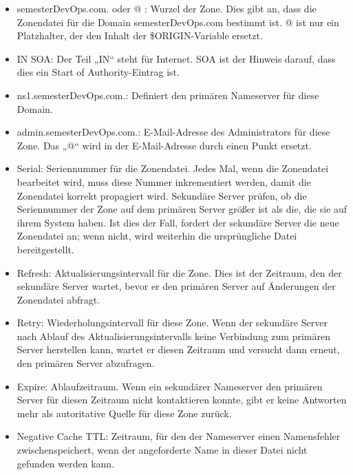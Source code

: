 \documentclass[a4paper,12pt]{article}
\begin{document}
\begin{itemize}
	\item semesterDevOps.com. oder @ : Wurzel der Zone. Dies gibt an, dass die Zonendatei für die Domain semesterDevOps.com bestimmt ist.
@ ist nur ein Platzhalter, der den Inhalt der \${}ORIGIN-Variable ersetzt.

\item IN SOA: Der Teil „IN“ steht für Internet. SOA ist der Hinweis darauf, dass dies ein Start of Authority-Eintrag ist.

\item ns1.semesterDevOps.com.: Definiert den primären Nameserver für diese Domain.

\item admin.semesterDevOps.com.: E-Mail-Adresse des Administrators für diese Zone. Das „@“ wird in der E-Mail-Adresse durch einen Punkt ersetzt.

\item Serial: Seriennummer für die Zonendatei. Jedes Mal, wenn die Zonendatei bearbeitet wird, muss diese Nummer inkrementiert werden, damit die Zonendatei korrekt propagiert wird.
Sekundäre Server prüfen, ob die Seriennummer der Zone auf dem primären Server größer ist als die, die sie auf ihrem System haben. Ist dies der Fall, fordert der sekundäre Server die neue Zonendatei an; wenn nicht, wird weiterhin die ursprüngliche Datei bereitgestellt.

\item Refresh: Aktualisierungsintervall für die Zone. Dies ist der Zeitraum, den der sekundäre Server wartet, bevor er den primären Server auf Änderungen der Zonendatei abfragt.

\item Retry: Wiederholungsintervall für diese Zone. Wenn der sekundäre Server nach Ablauf des Aktualisierungsintervalls keine Verbindung zum primären Server herstellen kann, wartet er diesen Zeitraum und versucht dann erneut, den primären Server abzufragen.

\item Expire: Ablaufzeitraum. Wenn ein sekundärer Nameserver den primären Server für diesen Zeitraum nicht kontaktieren konnte, gibt er keine Antworten mehr als autoritative Quelle für diese Zone zurück.

\item Negative Cache TTL: Zeitraum, für den der Nameserver einen Namensfehler zwischenspeichert, wenn der angeforderte Name in dieser Datei nicht gefunden werden kann.
\end{itemize}
\end{document}
